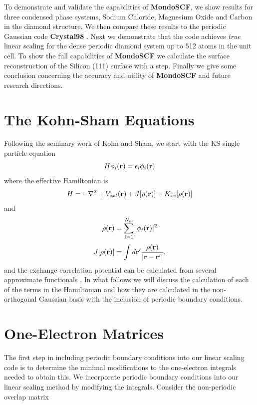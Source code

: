 \documentclass[prb,aps,nobibnotes,twocolumn,doublespace,twocolumngrid,superbib]{revtex4}
\begin{document}
To demonstrate and validate the capabilities of \textbf{MondoSCF}, we show results for 
three condensed phase systems, Sodium Chloride, Magnesium Oxide 
and Carbon in the diamond structure. We then compare these results to the periodic
Gaussian code \textbf{Crystal98} \cite{Crystal98}. Next we demonstrate that
the code achieves {\it true} linear scaling for the dense periodic diamond system 
up to 512 atoms in the unit cell.
%
%
To show the full capabilities of \textbf{MondoSCF} we calculate the surface reconstruction
of the Silicon (111) surface with a step.
%
Finally we give some conclusion concerning the accuracy and utility of \textbf{MondoSCF}
and future research directions.

\section{The Kohn-Sham Equations}

Following the seminary work of Kohn and Sham\cite{KohnSham65}, we start with the KS single 
particle equation
\begin{equation}
H \phi_{i}({\bf r})  = \epsilon_i \phi_{i}({\bf r})
\end{equation}
where the effective Hamiltonian is
\begin{equation}
H = -{\nabla}^{2}+ V_{ext}({\bf r}) + J[\rho({\bf r})] + K_{xc}[\rho({\bf r})]
\end{equation}
and
\begin{equation}
 \rho({\bf r}) = \sum_{i=1}^{N_{el}} | \phi_{i}({\bf r}) |^2
\end{equation}
\begin{equation}
 J[\rho({\bf r})] = \int d{\bf r'} {\rho({\bf r}) \over |{\bf r}-{\bf r'}|},
\end{equation}
and the exchange correlation potential can be calculated from several approximate
functionals
\cite{Becke92,Hertwig97,Bauschlicher95,Adamo00}. In what follows we will 
discuss the calculation of each of the terms in the Hamiltonian 
and how they are calculated in the non-orthogonal Gaussian basis
with the inclusion of periodic boundary conditions.

\section{One-Electron Matrices}

The first step in including periodic boundary conditions into our
linear scaling code is to determine the minimal modifications to the
one-electron integrals needed to obtain this. We incorporate periodic
boundary conditions into our linear scaling method by modifying the
integrals. Consider the non-periodic overlap matrix
\end{document}
